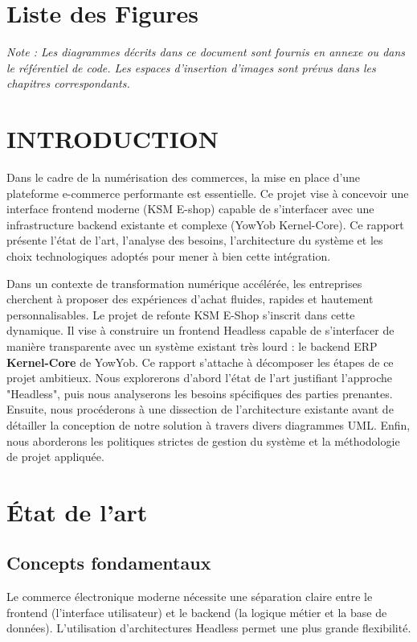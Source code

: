 \documentclass[12pt, a4paper]{report}
\begin{document}
\chapter*{Liste des Figures}
\listoffigures
\vspace{1cm}
\textit{Note : Les diagrammes décrits dans ce document sont fournis en annexe ou dans le référentiel de code. Les espaces d'insertion d'images sont prévus dans les chapitres correspondants.}
\newpage
\chapter*{INTRODUCTION}
Dans le cadre de la numérisation des commerces, la mise en place d'une plateforme e-commerce performante est essentielle. Ce projet vise à concevoir une interface frontend moderne (KSM E-shop) capable de s'interfacer avec une infrastructure backend existante et complexe (YowYob Kernel-Core). Ce rapport présente l'état de l'art, l'analyse des besoins, l'architecture du système et les choix technologiques adoptés pour mener à bien cette intégration.

Dans un contexte de transformation numérique accélérée, les entreprises cherchent à proposer des expériences d'achat fluides, rapides et hautement personnalisables. Le projet de refonte KSM E-Shop s'inscrit dans cette dynamique. Il vise à construire un frontend Headless capable de s'interfacer de manière transparente avec un système existant très lourd : le backend ERP \textbf{Kernel-Core} de YowYob. Ce rapport s'attache à décomposer les étapes de ce projet ambitieux. Nous explorerons d'abord l'état de l'art justifiant l'approche "Headless", puis nous analyserons les besoins spécifiques des parties prenantes. Ensuite, nous procéderons à une dissection de l'architecture existante avant de détailler la conception de notre solution à travers divers diagrammes UML. Enfin, nous aborderons les politiques strictes de gestion du système et la méthodologie de projet appliquée.
\chapter{État de l'art}
\section{Concepts fondamentaux}
Le commerce électronique moderne nécessite une séparation claire entre le frontend (l'interface utilisateur) et le backend (la logique métier et la base de données). L'utilisation d'architectures Headless permet une plus grande flexibilité.
\end{document}
